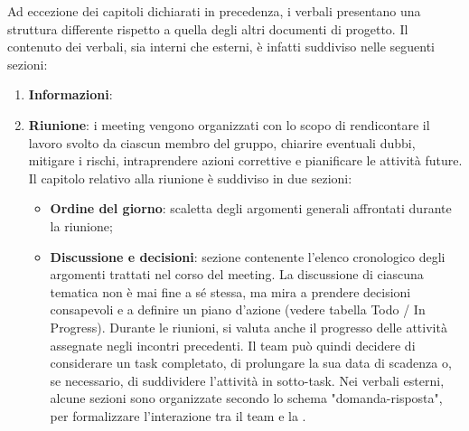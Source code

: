 \par Ad eccezione dei capitoli dichiarati in precedenza, i verbali presentano una struttura differente rispetto a quella degli altri documenti di progetto. Il contenuto dei verbali, sia interni che esterni, è infatti suddiviso nelle seguenti sezioni:
\begin{enumerate}
  \item \textbf{Informazioni}:
  \item \textbf{Riunione}: i meeting vengono organizzati con lo scopo di rendicontare il lavoro svolto da ciascun membro del gruppo, chiarire eventuali dubbi, mitigare i rischi, intraprendere azioni correttive e pianificare le attività future. Il capitolo relativo alla riunione è suddiviso in due sezioni:
  \begin{itemize}
    \item \textbf{Ordine del giorno}: scaletta degli argomenti generali affrontati durante la riunione;
    \item \textbf{Discussione e decisioni}: sezione contenente l'elenco cronologico degli argomenti trattati nel corso del meeting. La discussione di ciascuna tematica non è mai fine a sé stessa, ma mira a prendere decisioni consapevoli e a definire un piano d'azione (vedere tabella Todo / In Progress). Durante le riunioni, si valuta anche il progresso delle attività assegnate negli incontri precedenti. Il team può quindi decidere di considerare un task completato, di prolungare la sua data di scadenza o, se necessario, di suddividere l'attività in sotto-task. Nei verbali esterni, alcune sezioni sono organizzate secondo lo schema "domanda-risposta", per formalizzare l'interazione tra il team e la .  

\end{itemize}
\end{enumerate}
